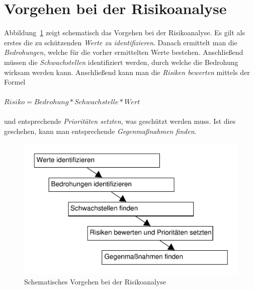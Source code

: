 ﻿\section{Vorgehen bei der Risikoanalyse}

Abbildung~\ref{5analysestufen} zeigt schematisch das Vorgehen bei der Risikoanalyse. Es gilt als erstes die zu schützenden \textit{Werte zu identifizieren}. Danach ermittelt man die \textit{Bedrohungen}, welche für die vorher ermittelten Werte bestehen. Anschließend müssen die \textit{Schwachstellen} identifiziert werden, durch welche die Bedrohung wirksam werden kann. Anschließend kann man die \textit{Risiken bewerten} mittels der Formel
\\\\
$ Risiko = Bedrohung * Schwachstelle * Wert $
\\\\
und entsprechende \textit{Prioritäten setzten}, was geschützt werden muss. Ist dies geschehen, kann man entsprechende \textit{Gegenmaßnahmen finden}.



\begin{figure}[h]
\includegraphics[scale=0.8]{images/5analysestufen.pdf}
\caption{Schematisches Vorgehen bei der Risikoanalyse}
\label{5analysestufen}
\end{figure}

